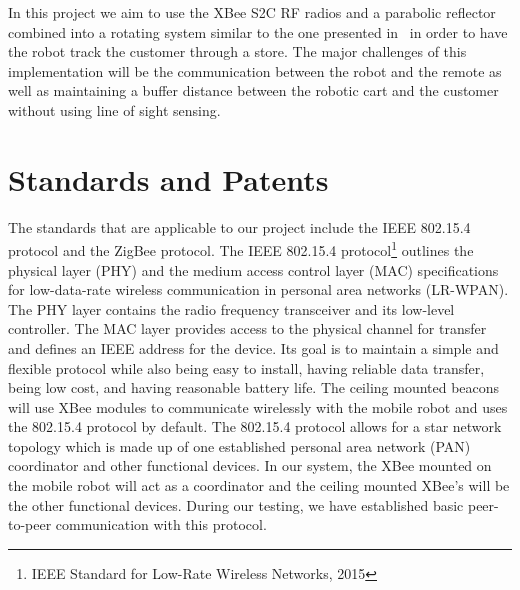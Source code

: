\documentclass[letterpaper,12pt]{article}   %
\begin{document}
\vspace*{12pt}
In this project we aim to use the XBee S2C RF radios and a parabolic reflector combined into a rotating system similar to the one presented in~\cite{8168364} in order to have the robot track the customer through a store. The major challenges of this implementation will be the communication between the robot and the remote as well as maintaining a buffer distance between the robotic cart and the customer without using line of sight sensing.


\section{Standards and Patents}
The standards that are applicable to our project include the IEEE 802.15.4 protocol and the ZigBee protocol. The IEEE 802.15.4 protocol\footnote{IEEE Standard for Low-Rate Wireless Networks, 2015} outlines the physical layer (PHY) and the medium access control layer (MAC) specifications for low-data-rate wireless communication in personal area networks (LR-WPAN). The PHY layer contains the radio frequency transceiver and its low-level controller. The MAC layer provides access to the physical channel for transfer and defines an IEEE address for the device. Its goal is to maintain a simple and flexible protocol while also being easy to install, having reliable data transfer, being low cost, and having reasonable battery life. The ceiling mounted beacons will use XBee modules to communicate wirelessly with the mobile robot and uses the 802.15.4 protocol by default. The 802.15.4 protocol allows for a star network topology which is made up of one established personal area network (PAN) coordinator and other functional devices. In our system, the XBee mounted on the mobile robot will act as a coordinator and the ceiling mounted XBee’s will be the other functional devices. During our testing, we have established basic peer-to-peer communication with this protocol.\\
\end{document}
